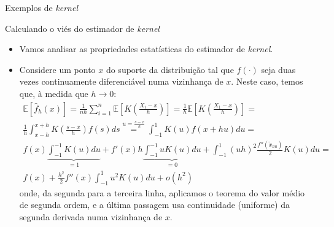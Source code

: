 \documentclass[11pt]{beamer}
\begin{document}
	\begin{frame}{Exemplos de \textit{kernel}}
		\centering 
	\end{frame}
	
	\begin{frame}{Calculando o viés do estimador de \textit{kernel}}
		\begin{itemize}
			\item Vamos analisar as propriedades estatísticas do estimador de \textit{kernel}.
			
			\item Considere um ponto $x$ do suporte da distribuição tal que $f(\cdot)$ seja duas vezes continuamente diferenciável numa vizinhança de $x$. Neste caso, temos que, à medida que $h \to 0$:
			\begin{equation*}
				\begin{aligned}
					\mathbb{E}[\hat{f}_h(x)] = \frac{1}{nh} \sum_{i=1}^n\mathbb{E}\left[K\left(\frac{X_i - x}{h}\right)\right] = \frac{1}{h}\mathbb{E}\left[K\left(\frac{X_1 - x}{h}\right)\right] = \\
				 \frac{1}{h}\int_{x - h}^{x+h} K\left(\frac{s-x}{h}\right) f(s) ds \overset{u = \frac{s-x}{h}}{=}	\int_{-1}^{1} K(u) f(x+hu) du = \\
					f(x)\underbrace{\int_{-1}^{-1}K(u)du}_{=1} + f'(x) h \underbrace{\int_{-1}^{-1}uK(u)du}_{=0} + \int_{-1}^1 (uh)^2 \frac{f''(\tilde{x}_{hu})}{2} K(u) du = \\
					f(x) +\frac{h^2}{2} f''(x) \int_{-1}^{1} u^2 K(u) du + o(h^2)  
				\end{aligned}
			\end{equation*}
			onde, da segunda para a terceira linha, aplicamos o teorema do valor médio de segunda ordem, e a última passagem usa continuidade (uniforme) da segunda derivada numa vizinhança de $x$.
		\end{itemize}
	\end{frame}
	
\end{document}
